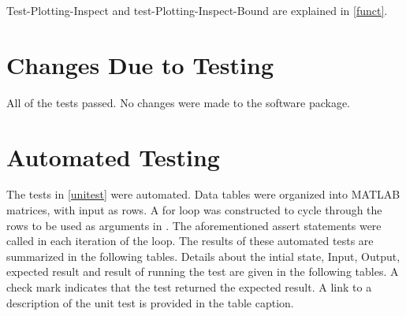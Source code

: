 \documentclass[12pt, titlepage]{article}
\begin{document}
\noindent
Test-Plotting-Inspect and test-Plotting-Inspect-Bound are explained in 
\ref{funct}. 

\section{Changes Due to Testing} 

All of the tests passed. No changes were made to the software package.

\section{Automated Testing} \label{automation} 

The tests in \ref{unitest} were automated. Data tables were organized into 
MATLAB matrices, with input as rows. A for loop was constructed to cycle 
through the rows to be used as arguments in \progname. The aforementioned 
assert statements were called in each iteration of the loop. The results of 
these automated tests are summarized in the following tables. Details about the 
intial state, Input, Output, expected result and result of running the
test are given in the following tables. A check mark indicates that the test 
returned the expected result. A link to a description of the unit test is 
provided in the table caption.
\end{document}
